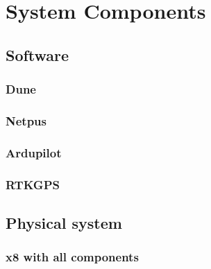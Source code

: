
\chapter{System Components}
\section{Software}
\subsection{Dune}
\subsection{Netpus}
\subsection{Ardupilot}
\subsection{RTKGPS}
\section{Physical system}
\subsection{x8 with all components}
\cleardoublepage